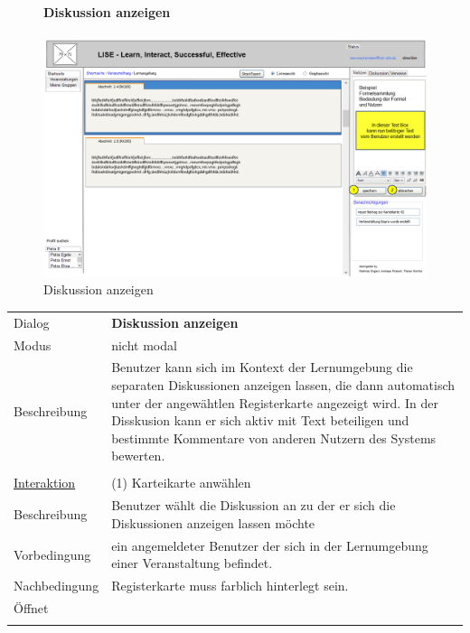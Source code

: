 \documentclass[12pt,a4paper]{article}
\begin{document}
{\begin{figure}[H]
	\centering
	\paragraph{Diskussion anzeigen}
	\includegraphics[width=\textwidth]{Bilder/Mockups/GUI/NotizAendernBearbeitungsfeld[Benutzer].png}
	\caption{Diskussion anzeigen}
	\label{GuiDiskussionAnzeigen}
\end{figure}

\begin{tabular}{l p{12cm}}
Dialog 	 		 & \textbf{Diskussion anzeigen} \\ 
Modus 			 & nicht modal\\ 
Beschreibung   	 & Benutzer kann sich im Kontext der Lernumgebung die separaten Diskussionen anzeigen lassen, die dann automatisch unter der angewähtlen Registerkarte angezeigt wird. In der Disskusion kann er sich aktiv mit Text beteiligen und bestimmte Kommentare von anderen Nutzern des Systems bewerten.\\\\

\underline{Interaktion} & (1) Karteikarte anwählen\\ 
Beschreibung   	 		& Benutzer wählt die Diskussion an zu der er sich die Diskussionen anzeigen lassen möchte\\
Vorbedingung	 		& ein angemeldeter Benutzer der sich in der Lernumgebung einer Veranstaltung befindet.\\
Nachbedingung	 		& Registerkarte muss farblich hinterlegt sein.\\
Öffnet			 		&  \\\\
\end{tabular}

}
\end{document}
